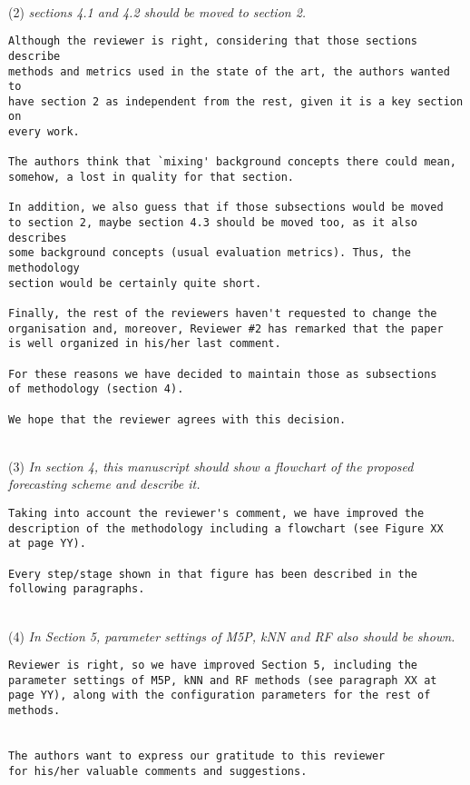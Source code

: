 \documentclass[preprint]{elsarticle}
\begin{document}
~\\
\noindent (2) \emph{sections 4.1 and 4.2 should be moved to section 2. } 

\begin{verbatim}
Although the reviewer is right, considering that those sections describe 
methods and metrics used in the state of the art, the authors wanted to 
have section 2 as independent from the rest, given it is a key section on 
every work. 

The authors think that `mixing' background concepts there could mean, 
somehow, a lost in quality for that section.

In addition, we also guess that if those subsections would be moved 
to section 2, maybe section 4.3 should be moved too, as it also describes 
some background concepts (usual evaluation metrics). Thus, the methodology 
section would be certainly quite short.

Finally, the rest of the reviewers haven't requested to change the 
organisation and, moreover, Reviewer #2 has remarked that the paper 
is well organized in his/her last comment.

For these reasons we have decided to maintain those as subsections 
of methodology (section 4).

We hope that the reviewer agrees with this decision.
\end{verbatim}


~\\
\noindent (3) \emph{In section 4, this manuscript should show a flowchart of the proposed forecasting scheme and describe it. } 

\begin{verbatim}
Taking into account the reviewer's comment, we have improved the 
description of the methodology including a flowchart (see Figure XX 
at page YY).

Every step/stage shown in that figure has been described in the 
following paragraphs.
\end{verbatim}


~\\
\noindent (4) \emph{In Section 5, parameter settings of 
M5P, kNN and RF also should be shown. } 

\begin{verbatim}
Reviewer is right, so we have improved Section 5, including the 
parameter settings of M5P, kNN and RF methods (see paragraph XX at 
page YY), along with the configuration parameters for the rest of 
methods.


The authors want to express our gratitude to this reviewer 
for his/her valuable comments and suggestions.
\end{verbatim}
\end{document}
